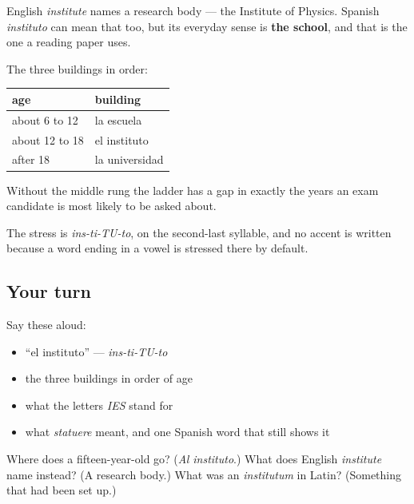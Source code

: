 \begin{grammarlens}[title={Grammar Lens: the false friend, and the ladder it breaks}]
English \emph{institute} names a research body — the Institute of Physics. Spanish \emph{instituto} can mean that too, but its everyday sense is \textbf{the school}, and that is the one a reading paper uses.

The three buildings in order:

\noindent
\begin{tabularx}{\linewidth}{@{}>{\raggedright\arraybackslash}X>{\raggedright\arraybackslash}X@{}}
\toprule
\textbf{age} & \textbf{building} \\
\midrule
about 6 to 12 & la escuela \\
about 12 to 18 & el instituto \\
after 18 & la universidad \\
\bottomrule
\end{tabularx}

Without the middle rung the ladder has a gap in exactly the years an exam candidate is most likely to be asked about.

The stress is \emph{ins-ti-TU-to}, on the second-last syllable, and no accent is written because a word ending in a vowel is stressed there by default.
\end{grammarlens}

\subsection*{Your turn}
Say these aloud:

\begin{itemize}
\raggedright
  \item \textquotedblleft{}el instituto\textquotedblright{} — \emph{ins-ti-TU-to}
  \item the three buildings in order of age
  \item what the letters \emph{IES} stand for
  \item what \emph{statuere} meant, and one Spanish word that still shows it
\end{itemize}

\begin{tcolorbox}[breakable,colback=teal!4,colframe=teal!35!black,title={Before you move on}]
Where does a fifteen-year-old go? (\emph{Al instituto}.) What does English \emph{institute} name instead? (A research body.) What was an \emph{institutum} in Latin? (Something that had been set up.)
\end{tcolorbox}
